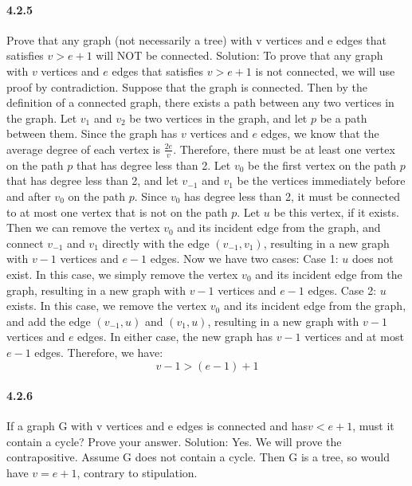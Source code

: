 \documentclass{article}
\begin{document}
\paragraph{4.2.5}Prove that any graph (not necessarily a tree) with v vertices and e
edges that satisfies $v > e + 1$ will NOT be connected.\newline
Solution:\newline
To prove that any graph with $v$ vertices and $e$ edges that satisfies $v > e + 1$ is not connected, we will use proof by contradiction.
\newline
Suppose that the graph is connected. Then by the definition of a connected graph, there exists a path between any two vertices in the graph. Let $v_1$ and $v_2$ be two vertices in the graph, and let $p$ be a path between them.
\newline
Since the graph has $v$ vertices and $e$ edges, we know that the average degree of each vertex is $\frac{2e}{v}$. Therefore, there must be at least one vertex on the path $p$ that has degree less than 2. Let $v_0$ be the first vertex on the path $p$ that has degree less than 2, and let $v_{-1}$ and $v_1$ be the vertices immediately before and after $v_0$ on the path $p$.
\newline
Since $v_0$ has degree less than 2, it must be connected to at most one vertex that is not on the path $p$. Let $u$ be this vertex, if it exists. Then we can remove the vertex $v_0$ and its incident edge from the graph, and connect $v_{-1}$ and $v_1$ directly with the edge $(v_{-1}, v_1)$, resulting in a new graph with $v-1$ vertices and $e-1$ edges.
\newline
Now we have two cases:
\newline
Case 1: $u$ does not exist. In this case, we simply remove the vertex $v_0$ and its incident edge from the graph, resulting in a new graph with $v-1$ vertices and $e-1$ edges.
\newline
Case 2: $u$ exists. In this case, we remove the vertex $v_0$ and its incident edge from the graph, and add the edge $(v_{-1}, u)$ and $(v_1, u)$, resulting in a new graph with $v-1$ vertices and $e$ edges.
\newline
In either case, the new graph has $v-1$ vertices and at most $e-1$ edges. Therefore, we have:
$$v-1 > (e-1)+1$$
 \paragraph{4.2.6}
If a graph G with v vertices and e edges is connected and has$ v < e +1$,
must it contain a cycle? Prove your answer.\newline
Solution:\newline
Yes. We will prove the contrapositive. Assume G does not contain
a cycle. Then G is a tree, so would have $v = e + 1$, contrary to stipulation.
\end{document}
